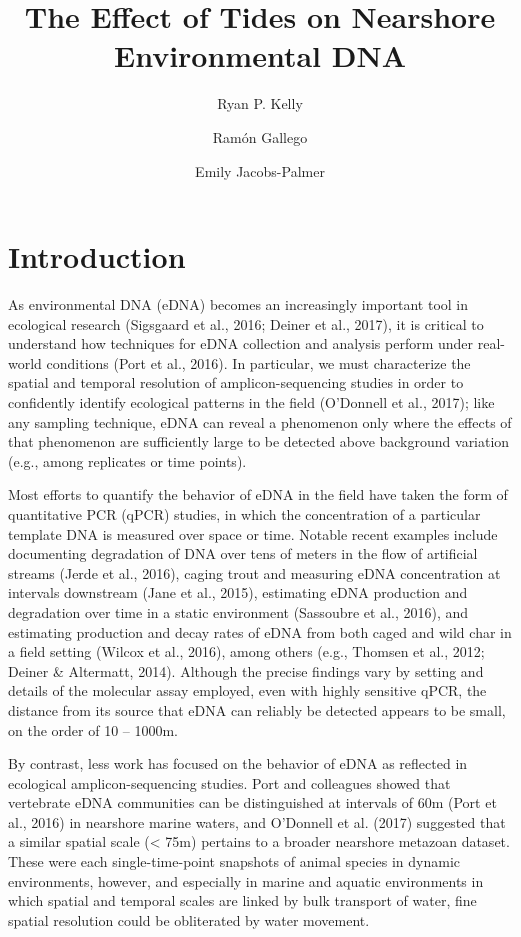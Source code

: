 \documentclass[fleqn,10pt,lineno]{wlpeerj} %
\title{The Effect of Tides on Nearshore Environmental DNA}
\author{Ryan P. Kelly}
\author{Ram\'{o}n Gallego}
\author{Emily Jacobs-Palmer}
\affil{University of Washington, School of Marine and Environmental Affairs, Seattle, Washington USA}
\begin{document}
\flushbottom
\maketitle
\thispagestyle{empty}

\section{Introduction}\label{introduction}

As environmental DNA (eDNA) becomes an increasingly important tool in
ecological research (Sigsgaard et al., 2016; Deiner et al., 2017), it is
critical to understand how techniques for eDNA collection and analysis
perform under real-world conditions (Port et al., 2016). In particular,
we must characterize the spatial and temporal resolution of
amplicon-sequencing studies in order to confidently identify ecological
patterns in the field (O'Donnell et al., 2017); like any sampling
technique, eDNA can reveal a phenomenon only where the effects of that
phenomenon are sufficiently large to be detected above background
variation (e.g., among replicates or time points).

Most efforts to quantify the behavior of eDNA in the field have taken
the form of quantitative PCR (qPCR) studies, in which the concentration
of a particular template DNA is measured over space or time. Notable
recent examples include documenting degradation of DNA over tens of
meters in the flow of artificial streams (Jerde et al., 2016), caging
trout and measuring eDNA concentration at intervals downstream (Jane et
al., 2015), estimating eDNA production and degradation over time in a
static environment (Sassoubre et al., 2016), and estimating production
and decay rates of eDNA from both caged and wild char in a field setting
(Wilcox et al., 2016), among others (e.g., Thomsen et al., 2012; Deiner
\& Altermatt, 2014). Although the precise findings vary by setting and
details of the molecular assay employed, even with highly sensitive
qPCR, the distance from its source that eDNA can reliably be detected
appears to be small, on the order of 10 -- 1000m.

By contrast, less work has focused on the behavior of eDNA as reflected
in ecological amplicon-sequencing studies. Port and colleagues showed
that vertebrate eDNA communities can be distinguished at intervals of
60m (Port et al., 2016) in nearshore marine waters, and O'Donnell et al.
(2017) suggested that a similar spatial scale (\textless{} 75m) pertains
to a broader nearshore metazoan dataset. These were each
single-time-point snapshots of animal species in dynamic environments,
however, and especially in marine and aquatic environments in which
spatial and temporal scales are linked by bulk transport of water, fine
spatial resolution could be obliterated by water movement.
\end{document}
